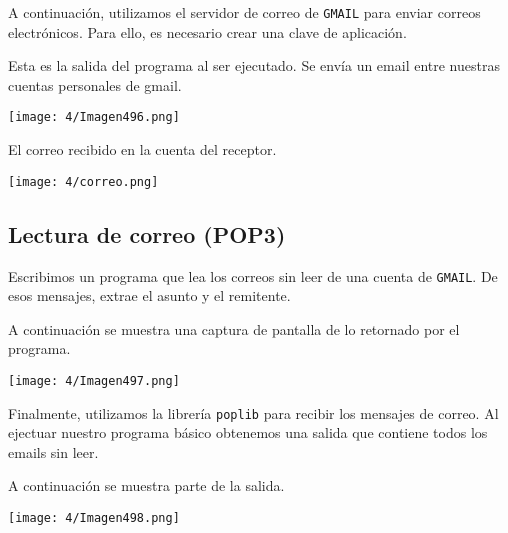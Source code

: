 A continuación, utilizamos el servidor de correo de \verb#GMAIL# para enviar correos electrónicos.
Para ello, es necesario crear una clave de aplicación.

Esta es la salida del programa al ser ejecutado.
Se envía un email entre nuestras cuentas personales de gmail.

\begin{minipage}{\linewidth}
	\centering
	\texttt{[image: 4/Imagen496.png]}
	\label{fig:4/14}
\end{minipage}

El correo recibido en la cuenta del receptor.

\begin{minipage}{\linewidth}
	\centering
	\texttt{[image: 4/correo.png]}
	\label{fig:4/15}
\end{minipage}

\subsection{Lectura de correo (POP3)}

Escribimos un programa que lea los correos sin leer de una cuenta de \verb#GMAIL#.
De esos mensajes, extrae el asunto y el remitente.

A continuación se muestra una captura de pantalla de lo retornado por el programa.

\begin{minipage}{\linewidth}
	\centering
	\texttt{[image: 4/Imagen497.png]}
	\label{fig:4/16}
\end{minipage}

Finalmente, utilizamos la librería \verb#poplib# para recibir los mensajes de correo.
Al ejectuar nuestro programa básico obtenemos una salida que contiene todos los emails
sin leer.

A continuación se muestra parte de la salida.

\begin{minipage}{\linewidth}
	\centering
	\texttt{[image: 4/Imagen498.png]}
	\label{fig:4/17}
\end{minipage}
